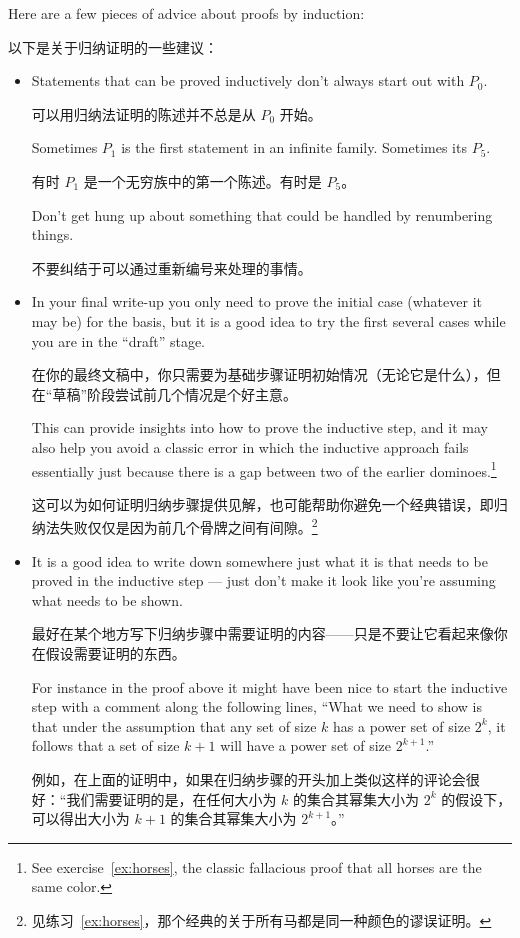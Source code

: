 Here are a few pieces
of advice about proofs by induction:

以下是关于归纳证明的一些建议：

\begin{itemize}
\item Statements that can be proved inductively don't always start out with 
$P_0$.

可以用归纳法证明的陈述并不总是从 $P_0$ 开始。

Sometimes $P_1$ is the first statement in an infinite family.
Sometimes its $P_5$.

有时 $P_1$ 是一个无穷族中的第一个陈述。有时是 $P_5$。

Don't get hung up about something that could be
handled by renumbering things.

不要纠结于可以通过重新编号来处理的事情。

\item In your final write-up you only need to prove the initial case
(whatever it may be) for the basis, but it is a good idea to try 
the first several cases while you are in the ``draft'' stage.

在你的最终文稿中，你只需要为基础步骤证明初始情况（无论它是什么），但在“草稿”阶段尝试前几个情况是个好主意。

This
can provide insights into how to prove the inductive step, and it may
also help you avoid a classic error in which the inductive approach fails
essentially just because there is a gap between two of the earlier 
dominoes.\footnote{See exercise~\ref{ex:horses}, the classic fallacious proof that all horses are the same color.}

这可以为如何证明归纳步骤提供见解，也可能帮助你避免一个经典错误，即归纳法失败仅仅是因为前几个骨牌之间有间隙。\footnote{见练习~\ref{ex:horses}，那个经典的关于所有马都是同一种颜色的谬误证明。}

\item It is a good idea to write down somewhere just what it is that
needs to be proved in the inductive step --- just don't make it look like 
you're assuming what needs to be shown.

最好在某个地方写下归纳步骤中需要证明的内容——只是不要让它看起来像你在假设需要证明的东西。

For instance in the proof above
it might have been nice to start the inductive step with a comment along
the following lines, ``What we need to show is that under the assumption
that any set of size $k$ has a power set of size $2^k$, it follows that
a set of size $k+1$ will have a power set of size $2^{k+1}$.'' 

例如，在上面的证明中，如果在归纳步骤的开头加上类似这样的评论会很好：“我们需要证明的是，在任何大小为 $k$ 的集合其幂集大小为 $2^k$ 的假设下，可以得出大小为 $k+1$ 的集合其幂集大小为 $2^{k+1}$。”
\end{itemize}
\medskip

